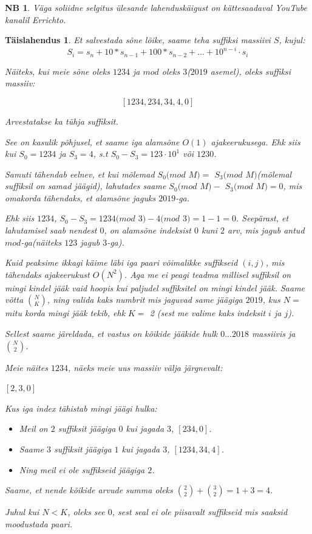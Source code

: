 \documentclass{trkut}
\newtheorem*{extra}{NB}
\newtheorem*{solution}{Täislahendus}
\begin{document}
\begin{extra}
Väga soliidne selgitus ülesande lahenduskäigust on kättesaadaval YouTube kanalil Errichto.
\end{extra}
\begin{solution}
Et salvestada sõne lõike, saame teha suffiksi massiivi $S$, kujul:
$${S_i = s_n + 10*s_{n-1} +100*s_{n-2} + ... + {10^{n-i}} \cdot s_{i}}$$

Näiteks, kui meie sõne oleks $1234$ ja $mod$ oleks $3$($2019$ asemel), oleks suffiksi massiiv:

$$[1234, 234, 34, 4, 0]$$

Arvestatakse ka tühja suffiksit.

See on kasulik põhjusel, et saame iga alamsõne $O(1)$ ajakeerukusega.
Ehk siis kui ${S_0} = 1234$ ja  ${S_3=4}$, s.t ${S_0}-{S_3} = 123 \cdot {10^1}$ või $1230$.

Samuti tähendab eelnev, et kui mõlemad ${S_0}(mod$ $M)=$ ${S_3}(mod$ $M)$(mõlemal suffiksil on samad jäägid), lahutades saame ${S_0}(mod$ $M)-$ ${S_3}(mod$ $M)=0$, mis omakorda tähendaks, et alamsõne jaguks $2019$-ga.

Ehk siis $1234$, ${S_0-{S_3}=1234(mod}$ $3)-4(mod$ $3)=1-1=0$. Seepärast, et lahutamisel saab nendest $0$, on alamsõne indeksist $0$ kuni $2$ arv, mis jagub antud $mod$-ga(näiteks $123$ jagub $3$-ga). 

Kuid peaksime ikkagi käime läbi iga paari võimalikke suffikseid $(i, j)$, mis tähendaks ajakeerukust $O(N^2)$. 
Aga me ei peagi teadma millisel suffiksil on mingi kindel jääk vaid hoopis kui paljudel suffiksitel on mingi kindel jääk.
Saame võtta ${N \choose K}$, ning valida kaks numbrit mis jaguvad same jäägiga $2019$, kus $N=$ mitu korda mingi jääk tekib, ehk $K=$ 2 (sest me valime kaks indeksit $i$ ja $j$).

Sellest saame järeldada, et vastus on kõikide jääkide hulk $0...2018$ massiivis ja ${N \choose 2}$.

Meie näites $1234$, näeks meie uus massiiv välja järgnevalt:

$[2, 3, 0]$

Kus iga index tähistab mingi jäägi hulka:
\begin{itemize}
\item Meil on $2$ suffiksit jäägiga $0$ kui jagada $3$, $[234, 0]$.
\item Saame $3$ suffiksit jäägiga $1$ kui jagada $3$, $[1234, 34, 4]$.
\item Ning meil ei ole suffikseid jäägiga $2$.
\end{itemize}

Saame, et nende kõikide arvude summa oleks ${2 \choose 2} + {3 \choose 2}=1+3=4$.

Juhul kui $N<K$, oleks see $0$, sest seal ei ole piisavalt suffikseid mis saaksid moodustada paari.

\end{solution}
\end{document}

